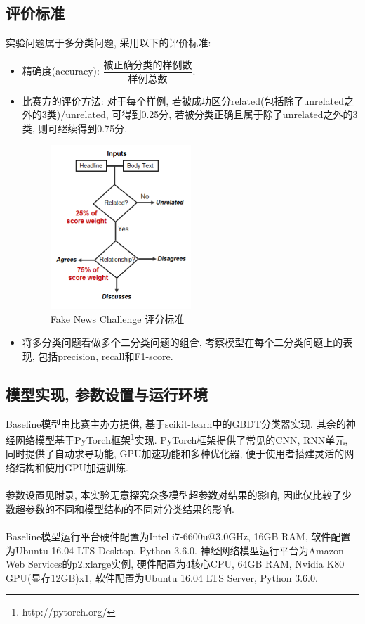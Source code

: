 \documentclass[a4paper]{article}
\begin{document}
	\subsection{评价标准}
	实验问题属于多分类问题, 采用以下的评价标准:
	\begin{itemize}
		\item 精确度(accuracy): $\dfrac{\text{被正确分类的样例数}}{\text{样例总数}}$.
		\item 比赛方的评价方法: 对于每个样例, 若被成功区分related(包括除了unrelated之外的3类)/unrelated, 可得到0.25分, 若被分类正确且属于除了unrelated之外的3类, 则可继续得到0.75分.
		\begin{figure}[H]
			\centering
			\includegraphics[width=0.5\textwidth]{fnc-eval.png}
			\caption{Fake News Challenge 评分标准}
			\label{fnc-eval}
		\end{figure}
		\item 将多分类问题看做多个二分类问题的组合, 考察模型在每个二分类问题上的表现, 包括precision, recall和F1-score.
	\end{itemize}
	\subsection{模型实现, 参数设置与运行环境}
	Baseline模型由比赛主办方提供, 基于scikit-learn中的GBDT分类器实现. 其余的神经网络模型基于PyTorch框架\footnote{http://pytorch.org/}实现. PyTorch框架提供了常见的CNN, RNN单元, 同时提供了自动求导功能, GPU加速功能和多种优化器, 便于使用者搭建灵活的网络结构和使用GPU加速训练.\\\\
	参数设置见附录, 本实验无意探究众多模型超参数对结果的影响, 因此仅比较了少数超参数的不同和模型结构的不同对分类结果的影响.\\\\
	Baseline模型运行平台硬件配置为Intel i7-6600u@3.0GHz, 16GB RAM, 软件配置为Ubuntu 16.04 LTS Desktop, Python 3.6.0. 神经网络模型运行平台为Amazon Web Services的p2.xlarge实例, 硬件配置为4核心CPU, 64GB RAM, Nvidia K80 GPU(显存12GB)x1, 软件配置为Ubuntu 16.04 LTS Server, Python 3.6.0.
\end{document}
